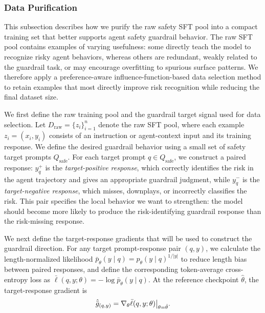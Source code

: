 \documentclass{llmxive}
\begin{document}
\subsubsection{Data Purification}
\label{sec:data_purification}

This subsection describes how we purify the raw safety SFT pool into a compact training set that better supports agent safety guardrail behavior. The raw SFT pool contains examples of varying usefulness: some directly teach the model to recognize risky agent behaviors, whereas others are redundant, weakly related to the guardrail task, or may encourage overfitting to spurious surface patterns. We therefore apply a preference-aware influence-function-based data selection method \cite{lin2026preferenceawareinfluencefunctionbaseddataselection} to retain examples that most directly improve risk recognition while reducing the final dataset size.

We first define the raw training pool and the guardrail target signal used for data selection. Let \(D_{\mathrm{raw}}=\{z_i\}_{i=1}^{n}\) denote the raw SFT pool, where each example \(z_i=(x_i,y_i)\) consists of an instruction or agent-context input and its training response. We define the desired guardrail behavior using a small set of safety target prompts \(Q_{\mathrm{safe}}\). For each target prompt \(q\in Q_{\mathrm{safe}}\), we construct a paired response: \(y_q^{+}\) is the \emph{target-positive response}, which correctly identifies the risk in the agent trajectory and gives an appropriate guardrail judgment, while \(y_q^{-}\) is the \emph{target-negative response}, which misses, downplays, or incorrectly classifies the risk. This pair specifies the local behavior we want to strengthen: the model should become more likely to produce the risk-identifying guardrail response than the risk-missing response.

We next define the target-response gradients that will be used to construct the guardrail direction. For any target prompt-response pair \((q,y)\), we calculate the length-normalized likelihood \(\bar p_{\theta}(y\mid q)=p_{\theta}(y\mid q)^{1/|y|}\) to reduce length bias between paired responses, and define the corresponding token-average cross-entropy loss as \(\bar\ell(q,y;\theta)=-\log \bar p_{\theta}(y\mid q)\). At the reference checkpoint \(\hat\theta\), the target-response gradient is
\begin{equation}
\small
\hat{\bar g}_{(q,y)}
=
\nabla_\theta \bar\ell(q,y;\theta)\big|_{\theta=\hat\theta}.
\label{eq:guardrail-target-gradient}
\end{equation}
\end{document}
